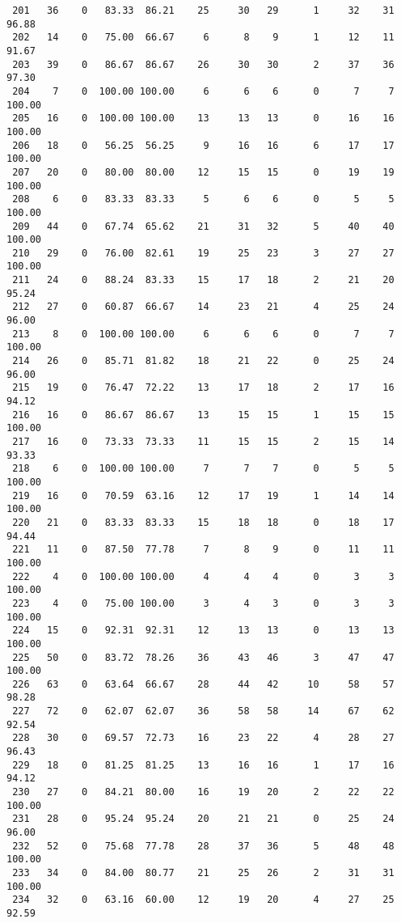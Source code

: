 \begin{verbatim}
 201   36    0   83.33  86.21    25     30   29      1     32    31    96.88
 202   14    0   75.00  66.67     6      8    9      1     12    11    91.67
 203   39    0   86.67  86.67    26     30   30      2     37    36    97.30
 204    7    0  100.00 100.00     6      6    6      0      7     7   100.00
 205   16    0  100.00 100.00    13     13   13      0     16    16   100.00
 206   18    0   56.25  56.25     9     16   16      6     17    17   100.00
 207   20    0   80.00  80.00    12     15   15      0     19    19   100.00
 208    6    0   83.33  83.33     5      6    6      0      5     5   100.00
 209   44    0   67.74  65.62    21     31   32      5     40    40   100.00
 210   29    0   76.00  82.61    19     25   23      3     27    27   100.00
 211   24    0   88.24  83.33    15     17   18      2     21    20    95.24
 212   27    0   60.87  66.67    14     23   21      4     25    24    96.00
 213    8    0  100.00 100.00     6      6    6      0      7     7   100.00
 214   26    0   85.71  81.82    18     21   22      0     25    24    96.00
 215   19    0   76.47  72.22    13     17   18      2     17    16    94.12
 216   16    0   86.67  86.67    13     15   15      1     15    15   100.00
 217   16    0   73.33  73.33    11     15   15      2     15    14    93.33
 218    6    0  100.00 100.00     7      7    7      0      5     5   100.00
 219   16    0   70.59  63.16    12     17   19      1     14    14   100.00
 220   21    0   83.33  83.33    15     18   18      0     18    17    94.44
 221   11    0   87.50  77.78     7      8    9      0     11    11   100.00
 222    4    0  100.00 100.00     4      4    4      0      3     3   100.00
 223    4    0   75.00 100.00     3      4    3      0      3     3   100.00
 224   15    0   92.31  92.31    12     13   13      0     13    13   100.00
 225   50    0   83.72  78.26    36     43   46      3     47    47   100.00
 226   63    0   63.64  66.67    28     44   42     10     58    57    98.28
 227   72    0   62.07  62.07    36     58   58     14     67    62    92.54
 228   30    0   69.57  72.73    16     23   22      4     28    27    96.43
 229   18    0   81.25  81.25    13     16   16      1     17    16    94.12
 230   27    0   84.21  80.00    16     19   20      2     22    22   100.00
 231   28    0   95.24  95.24    20     21   21      0     25    24    96.00
 232   52    0   75.68  77.78    28     37   36      5     48    48   100.00
 233   34    0   84.00  80.77    21     25   26      2     31    31   100.00
 234   32    0   63.16  60.00    12     19   20      4     27    25    92.59

\end{verbatim}
